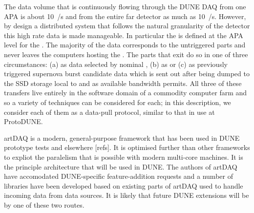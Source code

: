 The data volume that is continuously flowing through the DUNE
  DAQ from one APA is about \SI{10}{\GB/\s}
and from the entire far detector as much as \SI{10}{\TB/\s}.
However, by design a distributed system that follows the natural
granularity of the detector this high rate data is made manageable.
In particular the  is defined at the APA level for
the  .
The majority of the data corresponds to the untriggered parts and
never leaves the computers hosting the .
The parts that exit do so in one of three circumstances: (a) as data
selected by nominal , (b) as  or
(c) as previously triggered supernova burst candidate data which is
sent out after being dumped to the SSD storage local to
 and as available bandwidth permits. 
All three of these transfers live entirely in the software domain of a
commodity computer farm and so a variety of techniques can be
considered for each; in this description, we consider each of them as
a data-pull protocol, similar to that in use at ProtoDUNE.


artDAQ is a modern, general-purpose framework that has been used in
DUNE prototype tests and elsewhere [refs]. 
It is optimised further than other frameworks to expliot the
paralelism that is possible with modern multi-core machines. 
It is the principle architecture that will be used in DUNE.
The authors of artDAQ have accomodated DUNE-specific feature-addition
requests and a number of libraries have been developed based on
existing parts of artDAQ used to handle incoming data from data
sources. 
It is likely that future DUNE extensions will be by one of these two
routes.

